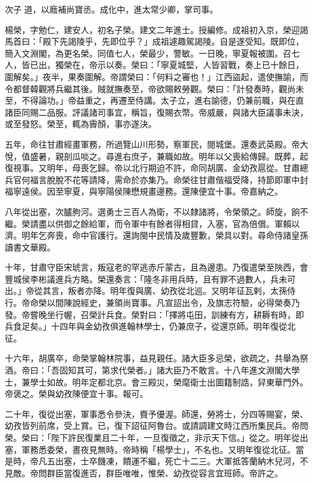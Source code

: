 \begin{pinyinscope}
次子道，以廕補尚寶丞。成化中，進太常少卿，掌司事。

楊榮，字勉仁，建安人，初名子榮。建文二年進士。授編修。成祖初入京，榮迎謁馬首曰：「殿下先謁陵乎，先即位乎？」成祖遽趣駕謁陵。自是遂受知。既即位，簡入文淵閣，為更名榮。同值七人，榮最少，警敏。一日晚，寧夏報被圍。召七人，皆已出，獨榮在，帝示以奏。榮曰：「寧夏城堅，人皆習戰，奏上已十餘日，圍解矣。」夜半，果奏圍解。帝謂榮曰：「何料之審也！」江西盜起，遣使撫諭，而令都督韓觀將兵繼其後。賊就撫奏至，帝欲賜敕勞觀。榮曰：「計發奏時，觀尚未至，不得論功。」帝益重之，再遷至侍講。太子立，進右諭德，仍兼前職，與在直諸臣同賜二品服。評議諸司事宜，稱旨，復賜衣幣。帝威嚴，與諸大臣議事未決，或至發怒。榮至，輒為霽顏，事亦遂決。

五年，命往甘肅經畫軍務，所過覽山川形勢，察軍民，閱城堡。還奏武英殿。帝大悅，值盛暑，親剖瓜啖之。尋進右庶子，兼職如故。明年以父喪給傳歸。既葬，起復視事。又明年，母喪乞歸。帝以北行期迫不許，命同胡廣、金幼孜扈從。甘肅總兵官何福言脫脫不花等請降，需命於亦集乃。命榮往甘肅偕福受降，持節即軍中封福寧遠侯。因至寧夏，與寧陽侯陳懋規畫邊務。還陳便宜十事。帝嘉納之。

八年從出塞，次臚朐河。選勇士三百人為衛，不以隸諸將，令榮領之。師旋，餉不繼。榮請盡以供御之餘給軍，而令軍中有餘者得相貸，入塞，官為倍償。軍賴以濟。明年乞奔喪，命中官護行。還詢閩中民情及歲豐歉，榮具以對。尋命侍諸皇孫讀書文華殿。

十年，甘肅守臣宋琥言，叛寇老的罕逃赤斤蒙古，且為邊患。乃復遣榮至陜西，會豐城侯李彬議進兵方略。榮還奏言：「隆冬非用兵時，且有罪不過數人，兵未可出。」帝從其言，叛者亦降。明年復與廣、幼孜從北巡。又明年征瓦剌，太孫侍行。帝命榮以間陳說經史，兼領尚寶事。凡宣詔出令，及旗志符驗，必得榮奏乃發。帝嘗晚坐行幄，召榮計兵食。榮對曰：「擇將屯田，訓練有方，耕耨有時，即兵食足矣。」十四年與金幼孜俱進翰林學士，仍兼庶子，從還京師。明年復從北征。

十六年，胡廣卒，命榮掌翰林院事，益見親任。諸大臣多忌榮，欲疏之，共舉為祭酒。帝曰：「吾固知其可，第求代榮者。」諸大臣乃不敢言。十八年進文淵閣大學士，兼學士如故。明年定都北京。會三殿災，榮麾衛士出圖籍制誥，舁東華門外。帝褒之。榮與幼孜陳便宜十事。報可。

二十年，復從出塞，軍事悉令參決，賚予優渥。師還，勞將士，分四等賜宴，榮、幼孜皆列前席，受上賞。已，復下詔征阿魯台。或請調建文時江西所集民兵。帝問榮。榮曰：「陛下許民復業且二十年，一旦復徵之，非示天下信。」從之。明年從出塞，軍務悉委榮，晝夜見無時。帝時稱「楊學士」，不名也。又明年復從北征。當是時，帝凡五出塞，士卒饑凍，饋運不繼，死亡十二三。大軍抵答蘭納木兒河，不見敵。帝問群臣當復進否，群臣唯唯，惟榮、幼孜從容言宜班師。帝許之。


\end{pinyinscope}
